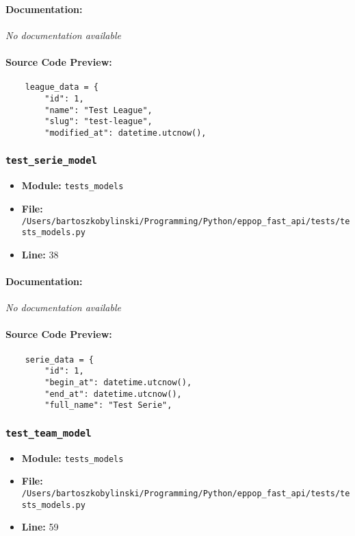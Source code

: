 \documentclass[11pt,a4paper]{article}
\begin{document}
\paragraph{Documentation:} \textit{No documentation available}

\paragraph{Source Code Preview:}
\begin{verbatim}
    league_data = {
        "id": 1,
        "name": "Test League",
        "slug": "test-league",
        "modified_at": datetime.utcnow(),
\end{verbatim}

\vspace{1em}
\subsubsection{\texttt{test\_serie\_model}}

\begin{itemize}
    \item \textbf{Module:} \texttt{tests\_models}
    \item \textbf{File:} \texttt{/Users/bartoszkobylinski/Programming/Python/eppop\_fast\_api/tests/tests\_models.py}
    \item \textbf{Line:} 38
\end{itemize}

\paragraph{Documentation:} \textit{No documentation available}

\paragraph{Source Code Preview:}
\begin{verbatim}
    serie_data = {
        "id": 1,
        "begin_at": datetime.utcnow(),
        "end_at": datetime.utcnow(),
        "full_name": "Test Serie",
\end{verbatim}

\vspace{1em}
\subsubsection{\texttt{test\_team\_model}}

\begin{itemize}
    \item \textbf{Module:} \texttt{tests\_models}
    \item \textbf{File:} \texttt{/Users/bartoszkobylinski/Programming/Python/eppop\_fast\_api/tests/tests\_models.py}
    \item \textbf{Line:} 59
\end{itemize}
\end{document}

